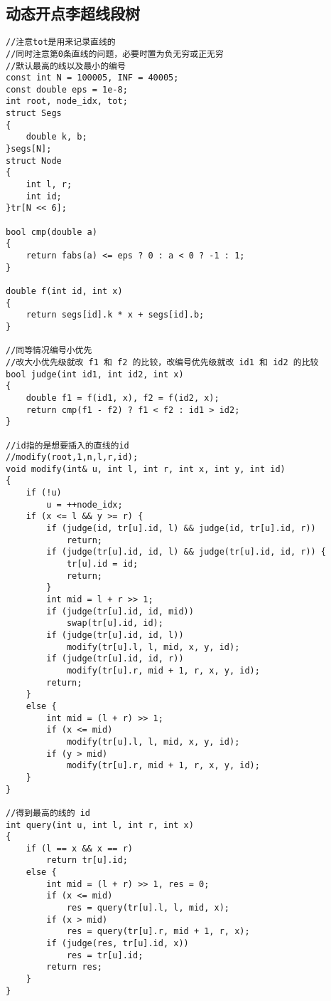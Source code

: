\documentclass[twocolumn,a4]{article}
\begin{document}
\subsection{动态开点李超线段树}
\begin{lstlisting}
//注意tot是用来记录直线的
//同时注意第0条直线的问题，必要时置为负无穷或正无穷
//默认最高的线以及最小的编号
const int N = 100005, INF = 40005;
const double eps = 1e-8;
int root, node_idx, tot;
struct Segs
{
    double k, b;
}segs[N];
struct Node
{
    int l, r;
    int id;
}tr[N << 6];

bool cmp(double a)
{
    return fabs(a) <= eps ? 0 : a < 0 ? -1 : 1;
}

double f(int id, int x)
{
    return segs[id].k * x + segs[id].b;
}

//同等情况编号小优先
//改大小优先级就改 f1 和 f2 的比较，改编号优先级就改 id1 和 id2 的比较
bool judge(int id1, int id2, int x)
{
    double f1 = f(id1, x), f2 = f(id2, x);
    return cmp(f1 - f2) ? f1 < f2 : id1 > id2;
}

//id指的是想要插入的直线的id
//modify(root,1,n,l,r,id);
void modify(int& u, int l, int r, int x, int y, int id)
{
    if (!u)
        u = ++node_idx;
    if (x <= l && y >= r) {
        if (judge(id, tr[u].id, l) && judge(id, tr[u].id, r))
            return;
        if (judge(tr[u].id, id, l) && judge(tr[u].id, id, r)) {
            tr[u].id = id;
            return;
        }
        int mid = l + r >> 1;
        if (judge(tr[u].id, id, mid))
            swap(tr[u].id, id);
        if (judge(tr[u].id, id, l))
            modify(tr[u].l, l, mid, x, y, id);
        if (judge(tr[u].id, id, r))
            modify(tr[u].r, mid + 1, r, x, y, id);
        return;
    }
    else {
        int mid = (l + r) >> 1;
        if (x <= mid)
            modify(tr[u].l, l, mid, x, y, id);
        if (y > mid)
            modify(tr[u].r, mid + 1, r, x, y, id);
    }
}

//得到最高的线的 id
int query(int u, int l, int r, int x)
{
    if (l == x && x == r)
        return tr[u].id;
    else {
        int mid = (l + r) >> 1, res = 0;
        if (x <= mid)
            res = query(tr[u].l, l, mid, x);
        if (x > mid)
            res = query(tr[u].r, mid + 1, r, x);
        if (judge(res, tr[u].id, x))
            res = tr[u].id;
        return res;
    }
}
\end{lstlisting}
\end{document}
